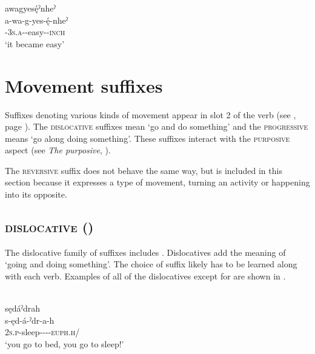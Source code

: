\ea\label{ex:heinchex2}
\ea awagyesę́ˀnheˀ\\
\gll a-wa-g-yes-ę́-nheˀ\\
{\factual}-\textsc{3s.a-\semireflexive}-easy-\textsc{\stative-inch}\\
\glt `it became easy'
\z
\z

\section{Movement suffixes} \label{Movement suffixes}
Suffixes denoting various kinds of movement appear in slot 2 of the verb (see , page \pageref{figtab:1:verbsuffixorder}). The \textsc{dislocative} suffixes mean ‘go and do something’ and the \textsc{progressive} means ‘go along doing something’. These suffixes interact with the \textsc{purposive} aspect (see \textit{The purposive}, ). 

The \textsc{reversive} suffix does not behave the same way, but is included in this section because it expresses a type of movement, turning an activity or happening into its opposite. 



\subsection{ \textsc{dislocative} (\dislocative)} \label{Dislocative suffixes [-hs, -hn] etc}
The dislocative family of suffixes includes . Dislocatives add the meaning of ‘going and doing something’. The choice of suffix likely has to be learned along with each verb. Examples of all of the dislocatives except for  are shown in .

\ea\label{ex:dislocendex}  {\dislocative}\\
sędáˀdrah\\
\gll s-ęd-á-ˀdr-a-h\\
 \textsc{2s.p}-sleep-{\joinerA}-{\dislocative}-{\joinerA}-\textsc{euph.h}/{\noaspect}\\
\glt `you go to bed, you go to sleep!'
\z


